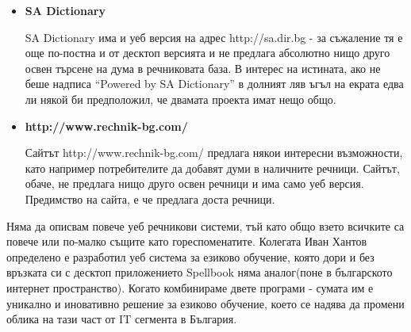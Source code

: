 \begin{itemize}
  \item \textbf{SA Dictionary}

    SA Dictionary има и уеб версия на адрес http://sa.dir.bg - за
    съжаление тя е още по-постна и от десктоп версията и не предлага
    абсолютно нищо друго освен търсене на дума в речниковата база. В
    интерес на истината, ако не беше надписа "`Powered by SA
    Dictionary"' в долният ляв ъгъл на екрата едва ли някой би
    предположил, че двамата проекта имат нещо общо.

  \item \textbf{http://www.rechnik-bg.com/}

    Сайтът http://www.rechnik-bg.com/ предлага някои интересни
    възможности, като например потребителите да добавят думи в
    наличните речници. Сайтът, обаче, не предлага нищо друго освен
    речници и има само уеб версия. Предимство на сайта, е че предлага
    доста речници.
\end{itemize}

Няма да описвам повече уеб речникови системи, тъй като общо взето
всичките са повече или по-малко същите като гореспоменатите. Колегата
Иван Хантов определено е разработил уеб система за езиково обучение,
която дори и без връзката си с десктоп приложението Spellbook няма
аналог(поне в българското интернет пространство). Когато комбинираме
двете програми - сумата им е уникално и иновативно решение за езиково
обучение, което се надява да промени облика на тази част от IT
сегмента в България.


